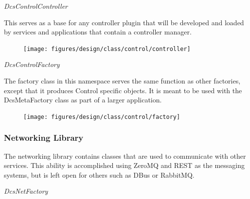       \emph{DcsControlController}

      \vspace*{-0.75cm}
      \begin{minipage}[t]{0.5\textwidth}
        \vspace*{0.5cm}
        This serves as a base for any controller plugin that will be developed
        and loaded by services and applications that contain a controller
        manager.
      \end{minipage} \hfill
      \begin{minipage}[t]{0.45\textwidth}
        \begin{figure}[H]
          \texttt{[image: figures/design/class/control/controller]}
          \label{fig:dsg-classes-control-controller}
        \end{figure}
      \end{minipage}

      \emph{DcsControlFactory}

      \vspace*{-0.75cm}
      \begin{minipage}[t]{0.5\textwidth}
        \vspace*{0.5cm}
        The factory class in this namespace serves the same function as other
        factories, except that it produces Control specific objects. It is
        meant to be used with the DcsMetaFactory class as part of a larger
        application.
      \end{minipage} \hfill
      \begin{minipage}[t]{0.45\textwidth}
        \begin{figure}[H]
          \texttt{[image: figures/design/class/control/factory]}
          \label{fig:dsg-classes-control-factory}
        \end{figure}
      \end{minipage}

    \newpage

    \subsubsection{Networking Library}\label{sec:dsg-classes-net}

      The networking library contains classes that are used to communicate with
      other services. This ability is accomplished using ZeroMQ and REST as the
      messaging systems, but is left open for others such as DBus or RabbitMQ.

      \emph{DcsNetFactory}

